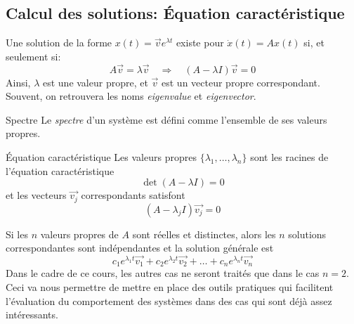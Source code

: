         \subsection{Calcul des solutions: Équation caractéristique}
            Une solution de la forme $x(t)=\overrightarrow{v} e^{\lambda t}$ existe pour $\dot{x}(t)=Ax(t)$ si, et seulement si:
            \begin{equation}
                A\overrightarrow{v}=\lambda \overrightarrow{v} \quad \Rightarrow \quad (A - \lambda I)\overrightarrow{v}=0
            \end{equation}
            Ainsi, $\lambda$ est une valeur propre, et $\overrightarrow{v}$ est un vecteur propre correspondant. Souvent, on retrouvera les noms \textit{eigenvalue} et \textit{eigenvector}.

            \begin{definition}{Spectre}
                Le \textit{spectre} d'un système est défini comme l'ensemble de ses valeurs propres.
            \end{definition}

            \begin{definition}{Équation caractéristique}
                Les valeurs propres $\{\lambda_1, \dots, \lambda_n\}$ sont les racines de l'équation caractéristique
                \begin{equation}\label{eq:equation_caracteristique}
                    \det(A - \lambda I)=0
                \end{equation}
                et les vecteurs $\overrightarrow{v_j}$ correspondants satisfont
                \begin{equation}\label{eq:vecteurs_propres}
                    (A - \lambda_j I)\overrightarrow{v_j}=0
                \end{equation}
            \end{definition}
    
            Si les $n$ valeurs propres de $A$ sont réelles et distinctes, alors les $n$ solutions correspondantes sont indépendantes et la solution générale est
            \begin{equation}
                c_1 e^{\lambda_1 t} \overrightarrow{v_1} + c_2 e^{\lambda_2 t} \overrightarrow{v_2} + \dots + c_n e^{\lambda_n t} \overrightarrow{v_n}
            \end{equation}
            Dans le cadre de ce cours, les autres cas ne seront traités que dans le cas $n=2$. Ceci va nous permettre de mettre en place des outils pratiques qui facilitent l'évaluation du comportement des systèmes dans des cas qui sont déjà assez intéressants.

